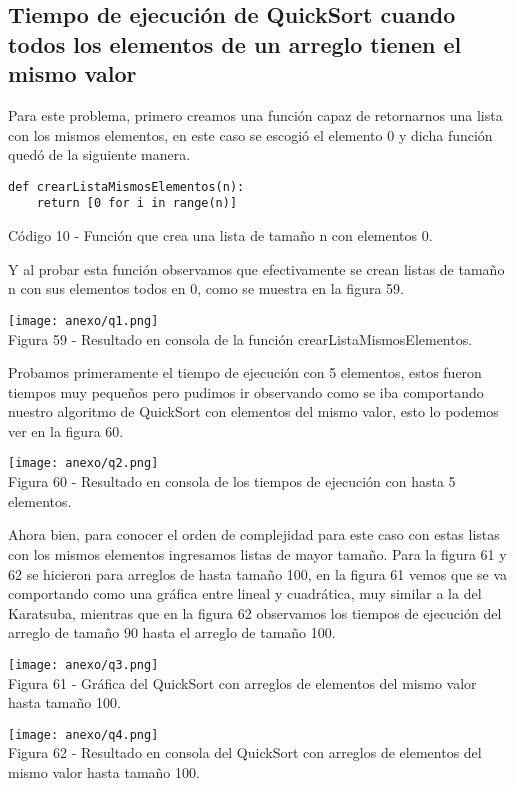 \documentclass[12pt,twoside]{article}
\begin{document}
\subsection{Tiempo de ejecución de QuickSort cuando todos los elementos de un arreglo tienen el mismo valor}
Para este problema, primero creamos una función capaz de retornarnos una lista con los mismos elementos, en este caso se escogió el elemento 0 y dicha función quedó de la siguiente manera.
\begin{lstlisting}
def crearListaMismosElementos(n):
	return [0 for i in range(n)]
\end{lstlisting}
\begin{center}
    Código 10 - Función que crea una lista de tamaño n con elementos 0.
\end{center}
Y al probar esta función observamos que efectivamente se crean listas de tamaño n con sus elementos todos en 0, como se muestra en la figura 59.
\begin{center}
    \texttt{[image: anexo/q1.png]}\\
    Figura 59 - Resultado en consola de la función crearListaMismosElementos.
\end{center}
Probamos primeramente el tiempo de ejecución con 5 elementos, estos fueron tiempos muy pequeños pero pudimos ir observando como se iba comportando nuestro algoritmo de QuickSort con elementos del mismo valor, esto lo podemos ver en la figura 60.
\begin{center}
    \texttt{[image: anexo/q2.png]}\\
    Figura 60 - Resultado en consola de los tiempos de ejecución con hasta 5 elementos.
\end{center}
Ahora bien, para conocer el orden de complejidad para este caso con estas listas con los mismos elementos ingresamos listas de mayor tamaño. Para la figura 61 y 62 se hicieron para arreglos de hasta tamaño 100, en la figura 61 vemos que se va comportando como una gráfica entre lineal y cuadrática, muy similar a la del Karatsuba, mientras que en la figura 62 observamos los tiempos de ejecución del arreglo de tamaño 90 hasta el arreglo de tamaño 100.
\begin{center}
    \texttt{[image: anexo/q3.png]}\\
    Figura 61 - Gráfica del QuickSort con arreglos de elementos del mismo valor hasta tamaño 100.
\end{center}
\begin{center}
    \texttt{[image: anexo/q4.png]}\\
    Figura 62 - Resultado en consola del QuickSort con arreglos de elementos del mismo valor hasta tamaño 100.
\end{center}
\end{document}
